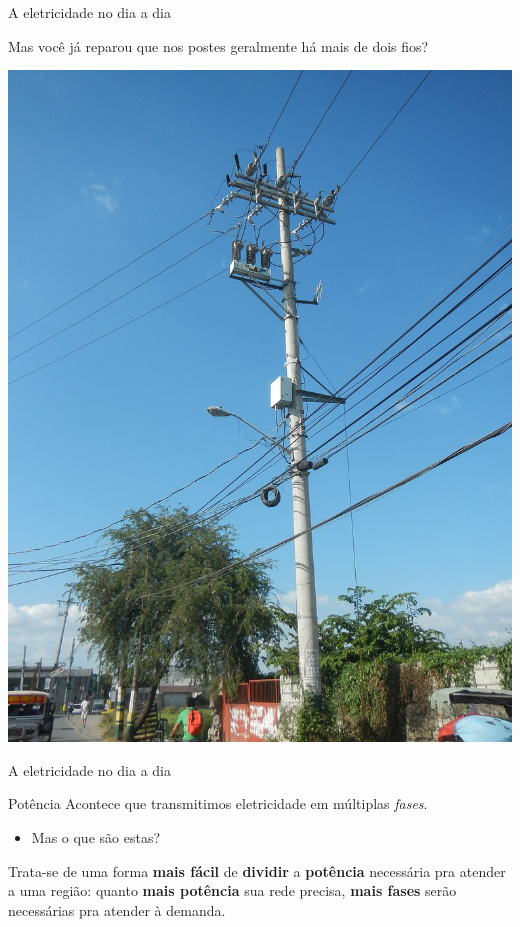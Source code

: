 \begin{frame}{A eletricidade no dia a dia}
	\begin{block}{}
		Mas você já reparou que nos postes geralmente há mais de dois fios?
	\end{block}

	\centering
	\includegraphics[height=0.7\textheight]{Figuras/Ch01/fig5}

\end{frame}


\begin{frame}{A eletricidade no dia a dia}
	\begin{block}{Potência}
		Acontece que transmitimos eletricidade em múltiplas \textit{fases}.

		\begin{itemize}
			\item Mas o que são estas?
		\end{itemize}

		Trata-se de uma forma \textbf{mais fácil} de \textbf{dividir} a \textbf{potência} necessária pra atender a uma região: quanto \textbf{mais potência} sua rede precisa, \textbf{mais fases} serão necessárias pra atender à demanda.
	\end{block}

\end{frame}



